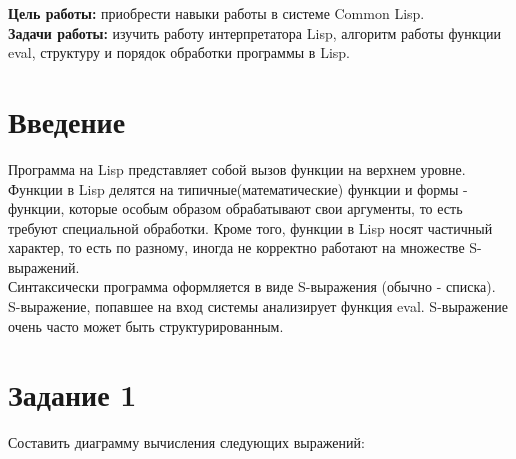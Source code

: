 \documentclass[a4paper, 12pt]{article}
\begin{document}
\tableofcontents
\clearpage
\newpage

\textbf{Цель работы:} приобрести навыки работы в системе Common Lisp.
\\ \hspace*{5mm} \textbf{Задачи работы:} изучить работу интерпретатора Lisp, алгоритм работы функции eval, структуру и порядок обработки программы в Lisp.


\section*{Введение}

\hspace*{5mm} Программа на Lisp представляет собой вызов функции на верхнем уровне. Функции в Lisp делятся на типичные(математические) функции и формы - функции, которые особым образом обрабатывают свои аргументы, то есть требуют специальной обработки. Кроме того, функции в Lisp носят частичный характер, то есть по разному, иногда не корректно работают на множестве S-выражений.
\\ \hspace*{5mm} Синтаксически программа оформляется в виде S-выражения (обычно - списка). S-выражение, попавшее на вход системы анализирует функция eval. S-выражение очень часто может быть структурированным.
\clearpage
\newpage

\section*{Задание 1}
Составить диаграмму вычисления следующих выражений:\\
\end{document}
